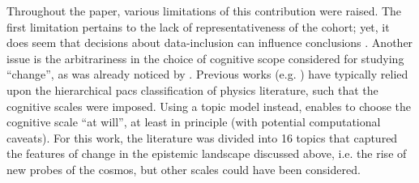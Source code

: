 \documentclass{article}
\begin{document}


Throughout the paper, various limitations of this contribution were raised. The first limitation pertains to the lack of representativeness of the cohort; yet, it does seem that decisions about data-inclusion can influence conclusions \citep{Aleta2019}. Another issue is the arbitrariness in the choice of cognitive scope considered for studying ``change'', as was already noticed by \citet{Gieryn1978}. Previous works (e.g. \citealt{Tripodi2020,Aleta2019,Battiston2019,Jia2017}) have typically relied upon the hierarchical \gls{pacs} classification of physics literature, such that the cognitive scales were imposed. Using a topic model instead, enables to choose the cognitive scale ``at will'', at least in principle (with potential computational caveats). For this work, the literature was divided into 16 topics that captured the features of change in the epistemic landscape discussed above, i.e. the rise of new probes of the cosmos, but other scales could have been considered. %
\end{document}
